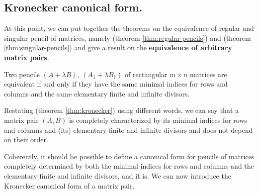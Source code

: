 \subsection*{Kronecker canonical form.}
At this point, we can put together the theorems on the equivalence of regular and singular pencil of matrices, namely
 (theorem \ref{thm:regular-pencils}) and
 (theorem \ref{thm:singular-pencils}) and give a result on the \textbf{equivalence of
arbitrary matrix pairs}.
\begin{theorem}[Kronecker]\label{thm:kronecker}
    Two pencils \((A + \lambda B)\), \((A_{1} + \lambda B_{1})\) of rectangular \(m \times n\) matrices
    are equivalent if and only if they have the same minimal indices for rows and columns and the same elementary finite and
    infinite divisors.
\end{theorem}

\begin{remark}
    Restating  (theorem \ref{thm:kronecker}) using different words, we can say that a matrix pair
    \((A, B)\) is completely characterized by its minimal indices for rows and columns and (its) elementary finite and
    infinite divisors and does not depend on their order.
\end{remark}

Coherently, it should be possible to define a canonical form for pencils of matrices completely determined by both
the minimal indices for rows and columns and the elementary finite and infinite divisors, and it is. We can now introduce
the Kronecker canonical form of a matrix pair.

